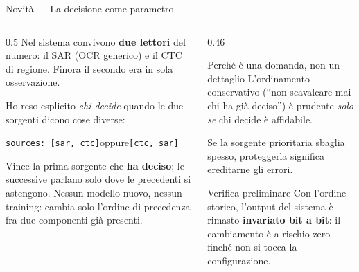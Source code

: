 \documentclass[aspectratio=169,10pt]{beamer}
\begin{document}
\begin{frame}{Novità --- La decisione come parametro}
  \begin{columns}[T]
    \begin{column}{0.5\textwidth}
      \small
      Nel sistema convivono \textbf{due lettori} del numero: il SAR (OCR
      generico) e il CTC di regione. Finora il secondo era in sola
      osservazione.
      \vspace{0.4em}

      Ho reso esplicito \emph{chi decide} quando le due sorgenti dicono cose
      diverse:
      \vspace{0.3em}
      \begin{center}\footnotesize
      \texttt{sources: [sar, ctc]}\quad oppure\quad \texttt{[ctc, sar]}
      \end{center}
      \vspace{0.4em}
      Vince la prima sorgente che \textbf{ha deciso}; le successive parlano
      solo dove le precedenti si astengono.
      \vspace{0.4em}
      Nessun modello nuovo, nessun training: cambia solo l'ordine di
      precedenza fra due componenti già presenti.
    \end{column}
    \begin{column}{0.46\textwidth}
      \footnotesize
      \begin{block}{Perché è una domanda, non un dettaglio}
        L'ordinamento conservativo (``non scavalcare mai chi ha già deciso'')
        è prudente \emph{solo se} chi decide è affidabile.
        \vspace{0.3em}

        Se la sorgente prioritaria sbaglia spesso, proteggerla significa
        ereditarne gli errori.
      \end{block}
      \vspace{0.4em}
      \begin{block}{Verifica preliminare}
        Con l'ordine storico, l'output del sistema è rimasto
        \textbf{invariato bit a bit}: il cambiamento è a rischio zero finché
        non si tocca la configurazione.
      \end{block}
    \end{column}
  \end{columns}
\end{frame}
\end{document}
